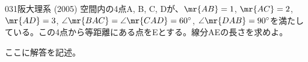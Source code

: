 \begin{thm}{031}{}{阪大理系 (2005)}
 空間内の4点A, B, C, Dが、$\mr{AB}=1$, $\mr{AC}=2$, $\mr{AD}=3$, $\angle\mr{BAC}=\angle\mr{CAD}=60^\circ$, $\angle\mr{DAB}=90^\circ$を満たしている。この4点から等距離にある点をEとする。線分AEの長さを求めよ。
\end{thm}

ここに解答を記述。